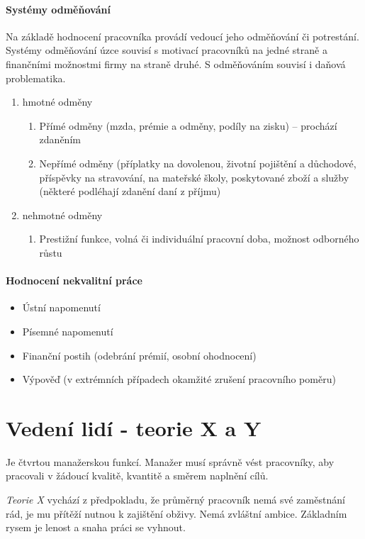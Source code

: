 \paragraph*{Systémy odměňování}
Na základě hodnocení pracovníka provádí vedoucí jeho odměňování či potrestání. Systémy odměňování úzce souvisí s motivací pracovníků na jedné straně a finančními možnostmi firmy na straně druhé. S odměňováním souvisí i daňová problematika.
\begin{enumerate}
    \item hmotné odměny
        \begin{enumerate}
            \item Přímé odměny (mzda, prémie a odměny, podíly na zisku) -- prochází zdaněním
            \item Nepřímé odměny (příplatky na dovolenou, životní pojištění a důchodové, příspěvky na stravování, na mateřské školy, poskytované zboží a služby (některé podléhají zdanění daní z příjmu)
        \end{enumerate}
    \item nehmotné odměny
        \begin{enumerate}
            \item Prestižní funkce, volná či individuální pracovní doba, možnost odborného růstu
        \end{enumerate}
\end{enumerate}

\paragraph*{Hodnocení nekvalitní práce}
\begin{itemize}
    \item Ústní napomenutí
    \item Písemné napomenutí
    \item Finanční postih (odebrání prémií, osobní ohodnocení)
    \item Výpověď (v extrémních případech okamžité zrušení pracovního poměru)
\end{itemize}

\section*{Vedení lidí - teorie X a Y}
Je čtvrtou manažerskou funkcí. Manažer musí správně vést pracovníky, aby pracovali v žádoucí kvalitě, kvantitě a směrem naplnění cílů.

\emph{Teorie X} vychází z předpokladu, že průměrný pracovník nemá své zaměstnání rád, je mu přítěží nutnou k zajištění obživy. Nemá zvláštní ambice. Základním rysem je lenost a snaha práci se vyhnout.

